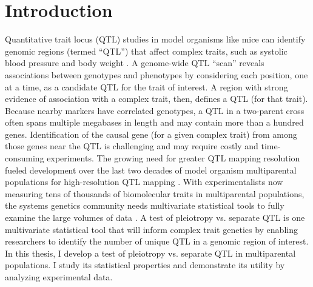 \documentclass[oneside]{book}\usepackage[]{graphicx}\usepackage[]{color}
\begin{document}

%



\tableofcontents
\listoffigures
\listoftables
\mainmatter %

\chapter{Introduction}

Quantitative trait locus (QTL) studies in model organisms like mice can identify 
genomic regions (termed ``QTL'') that affect complex traits, such as systolic blood pressure and body weight \citep{sax1923association,lander1989mapping,broman2009guide,jansen2007quantitative}.
A genome-wide QTL ``scan'' reveals
associations between genotypes and phenotypes by considering each position,
one at a time, as a candidate QTL for the trait of interest.
A region with strong evidence of association with a complex trait, then, defines a QTL (for that trait). 
Because nearby markers have correlated
genotypes, a QTL in a two-parent cross often spans multiple megabases in length
and may contain more than a hundred genes.
Identification of the causal gene (for a given complex trait) from among those genes near the QTL is
challenging and may require costly and time-consuming experiments. 
The growing need for greater QTL mapping resolution fueled development over the
last two decades of model organism multiparental populations for high-resolution QTL mapping \citep{de2017back,churchill2004collaborative,svenson2012high,huang2012multiparent,shivakumar2018soybean,huang2011analysis,kover2009multiparent,tisne2017identification,stanley2017genetic}.
With experimentalists now measuring tens of thousands of biomolecular traits 
in multiparental populations, the systems genetics community needs multivariate
statistical tools to fully examine the large volumes of data \citep{keller2018genetic,chick2016defining}. 
A test of pleiotropy vs. separate QTL is one multivariate statistical tool that will inform
complex trait genetics by enabling researchers to identify the number of
unique QTL in a genomic region of interest.
In this thesis, I develop a test of pleiotropy vs. separate QTL in multiparental
populations. I study its statistical properties and demonstrate its utility
by analyzing experimental data. 
\end{document}
